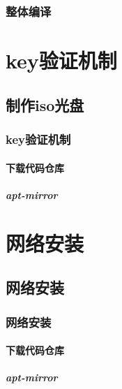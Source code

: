 \documentclass[a4paper,10pt]{article}
\begin{document}
\begin{CJK}{UTF8}{gbsn}
\subsection{}
\subsubsection{}
\section{整体编译}
\subsection{}
\subsubsection{}

\part{key验证机制}
\chapter{制作iso光盘}
\section{key验证机制}
\subsection{下载代码仓库}
\subsubsection{apt-mirror}

\part{网络安装}
\chapter{网络安装}
\section{网络安装}
\subsection{下载代码仓库}
\subsubsection{apt-mirror}


\end{CJK}
\end{document}

